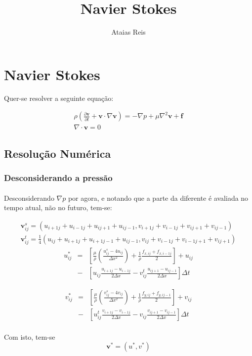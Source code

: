 \documentclass[a4paper,11pt]{article}
\title{Navier Stokes}
\author{Ataias Reis}
\begin{document}
\section{Navier Stokes}
Quer-se resolver a seguinte equação:

\begin{eqnarray}
\rho\left( \frac{\partial \textbf{v}}{\partial
t}+\textbf{v}\cdot\nabla\textbf{v}\right)=-\nabla
p+\mu\nabla^2\textbf{v}+\textbf{f}\\
 \nabla\cdot \textbf{v}=0
\end{eqnarray}
\subsection{Resolução Numérica}
\subsubsection{Desconsiderando a pressão}
\paragraph{} Desconsiderando $\nabla p$ por agora, e notando que a parte da diferente é avaliada no tempo atual, não no futuro, tem-se:

\begin{eqnarray}
\textbf{v}_{ij}^s=(u_{i+1j}+u_{i-1j}+u_{ij+1}+u_{ij-1},v_{i+1j}+v_{i-1j}+v_{ij+1}+v_{ij-1})\\
\textbf{v}_{ij}^t=\frac{1}{4}(u_{ij}+u_{i+1j}+u_{i+1j-1}+u_{ij-1},v_{ij}+v_{i-1j}+v_{i-1j+1}+v_{ij+1})
\end{eqnarray}
\begin{eqnarray}
u_{ij}^{*}&=&\left[\frac{\mu}{\rho}\left(\frac{u_{ij}^s-4u_{ij}}{\Delta
x^2}\right)+\frac{1}{\rho}\frac{f_{x,ij}+f_{x,i-1j}}{2}\right] + u_{ij}\nonumber \\
&-&\left[u_{ij}\frac{u_{i+1j}-u_{i-1j}}{2\Delta
x}-v_{ij}^t\frac{u_{ij+1}-u_{ij-1}}{2\Delta x}\right]\Delta t
\end{eqnarray}

\begin{eqnarray}
v_{ij}^{*}&=&\left[\frac{\mu}{\rho}\left(\frac{v_{ij}^s-4v_{ij}}{\Delta
x^2}\right)+\frac{1}{\rho}\frac{f_{y,ij}+f_{y,ij-1}}{2}\right] + v_{ij}\nonumber \\
&-&\left[u_{ij}^t\frac{v_{i+1j}-v_{i-1j}}{2\Delta
x}-v_{ij}\frac{v_{ij+1}-v_{ij-1}}{2\Delta x}\right]\Delta t
\end{eqnarray}

\paragraph{} Com isto, tem-se \[\textbf{v}^{*}=(u^*,v^*)\]
\end{document}
